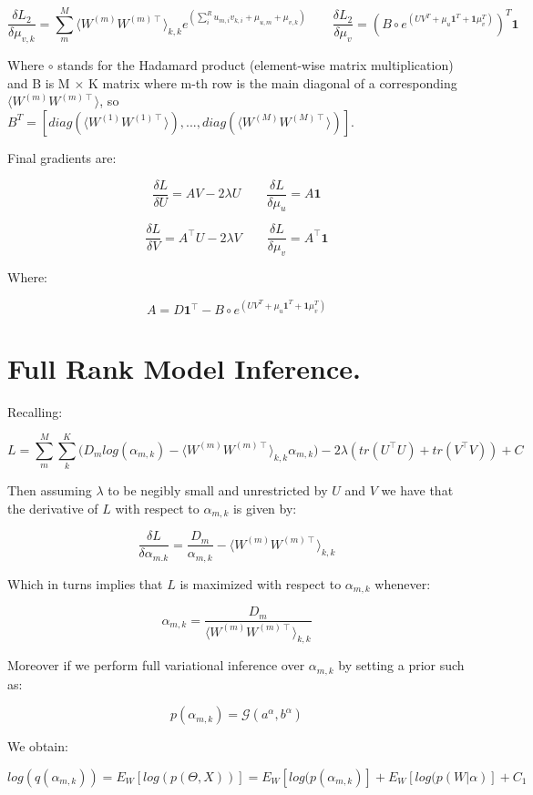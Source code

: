 \documentclass{article}
\begin{document}
$$\frac{\delta L_2}{\delta \mu_{v,k}} = \sum_m^M{\langle W^{(m)}W^{(m)\intercal}\rangle_{k,k}e^{(\sum_i^R{u_{m,i}v_{k,i}}+\mu_{u,m}+\mu_{v,k})} } \qquad \frac{\delta L_2}{\delta \mu_v} = (B \circ e^{(UV^T+\mu_u\textbf{1}^T+\textbf{1}\mu_v^T)})^T \textbf{1}$$

Where $\circ$ stands for the Hadamard product (element-wise matrix multiplication) and B is M $\times$ K matrix where m-th row is the main diagonal of a corresponding $\langle W^{(m)}W^{(m)\intercal}\rangle$, so  $B^T=[diag(\langle W^{(1)}W^{(1)\intercal}\rangle),...,diag(\langle W^{(M)}W^{(M)\intercal}\rangle)]$.

Final gradients are:

$$\frac{\delta L}{\delta U} = AV -2 \lambda U \qquad \frac{\delta L}{\delta \mu_u} = A\textbf{1}$$

$$\frac{\delta L}{\delta V} = A^\intercal U -2 \lambda V \qquad \frac{\delta L}{\delta \mu_v} = A^\intercal \textbf{1}$$

Where:

$$A = D\textbf{1}^\intercal - B \circ e^{(UV^T+\mu_u\textbf{1}^T+\textbf{1}\mu_v^T)}$$

\section*{Full Rank Model Inference.}

Recalling:  

$$L = \sum_m^M{\sum_k^K{\Big(D_mlog(\alpha_{m,k}) - \langle W^{(m)}W^{(m)\intercal}\rangle_{k,k} \alpha_{m,k}}}\Big)-2\lambda (tr(U^\intercal U) + tr(V^\intercal V)) + C$$

Then assuming $\lambda$ to be negibly small and unrestricted by $U$ and $V$ we have that the derivative of $L$ with respect to $\alpha_{m,k}$ is given by:

$$\frac{\delta L}{\delta \alpha_{m.k}} = \frac{D_m}{\alpha_{m,k}} - \langle W^{(m)}W^{(m)\intercal}\rangle_{k,k}$$

Which in turns implies that $L$ is maximized with respect to $\alpha_{m,k}$ whenever:

$$\alpha_{m,k} = \frac{D_m}{\langle W^{(m)}W^{(m)\intercal}\rangle_{k,k}}$$

Moreover if we perform full variational inference over $\alpha_{m,k}$ by setting a prior such as:

$$p(\alpha_{m,k}) = \mathcal{G}(a^\alpha,b^\alpha)$$

We obtain:

$$log(q(\alpha_{m,k})) = E_{W}[log(p(\Theta,X))] = E_{W}[log(p(\alpha_{m,k})] + E_{W}[log(p(W|\alpha)] + C_1$$
\end{document}
